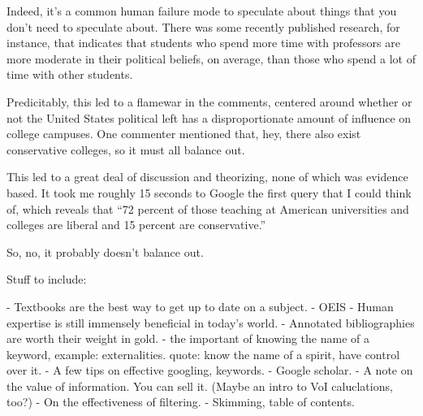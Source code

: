 Indeed, it's a common human failure mode to speculate about things that you don't need to speculate about. There was some recently published research, for instance, that indicates that students who spend more time with professors are more moderate in their political beliefs, on average, than those who spend a lot of time with other students.

Predicitably, this led to a flamewar in the comments, centered around whether or not the United States political left has a disproportionate amount of influence on college campuses. One commenter mentioned that, hey, there also exist conservative colleges, so it must all balance out.

This led to a great deal of discussion and theorizing, none of which was evidence based. It took me roughly 15 seconds to Google the first query that I could think of, which reveals that ``72 percent of those teaching at American universities and colleges are liberal and 15 percent are conservative.''

So, no, it probably doesn't balance out.


Stuff to include:

- Textbooks are the best way to get up to date on a subject.
- OEIS
- Human expertise is still immensely beneficial in today's world.
- Annotated bibliographies are worth their weight in gold.
- the important of knowing the name of a keyword, example: externalities. quote: know the name of a spirit, have control over it.
- A few tips on effective googling, keywords.
- Google scholar.
- A note on the value of information. You can sell it. (Maybe an intro to VoI caluclations, too?)
- On the effectiveness of filtering. 
- Skimming, table of contents.
